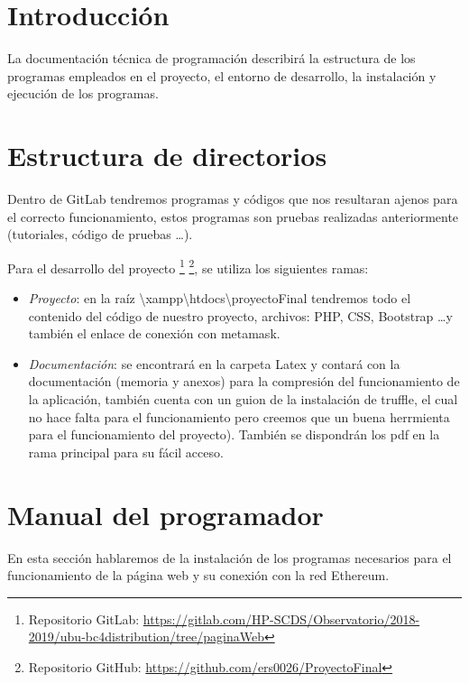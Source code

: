 
\section{Introducción}

La documentación técnica de programación describirá la estructura de los programas empleados en el proyecto, el entorno de desarrollo, la instalación y ejecución de los programas.

\section{Estructura de directorios}

Dentro de GitLab tendremos programas y códigos que nos resultaran ajenos para el correcto funcionamiento, estos programas son pruebas realizadas anteriormente (tutoriales, código de pruebas \ldots).

Para el desarrollo del proyecto \footnote{Repositorio GitLab: \url{https://gitlab.com/HP-SCDS/Observatorio/2018-2019/ubu-bc4distribution/tree/paginaWeb}} \footnote{Repositorio GitHub: \url{https://github.com/ers0026/ProyectoFinal}}, se utiliza los siguientes ramas:

\begin{itemize}
	\item \textit{Proyecto}: en la raíz \textbackslash xampp\textbackslash htdocs\textbackslash proyectoFinal tendremos todo el contenido del código de nuestro proyecto, archivos: PHP, CSS, Bootstrap \ldots y también el enlace de conexión con metamask.
	\item \textit{Documentación}: se encontrará en la carpeta Latex y contará con la documentación (memoria y anexos) para la compresión del funcionamiento de la aplicación, también cuenta con un guion de la instalación de truffle, el cual no hace falta para el funcionamiento pero creemos que un buena herrmienta para el funcionamiento del proyecto). También se dispondrán los pdf en la rama principal para su fácil acceso.
\end{itemize}

\section{Manual del programador}

En esta sección hablaremos de la instalación de los programas necesarios para el funcionamiento de la página web y su conexión con la red Ethereum.

